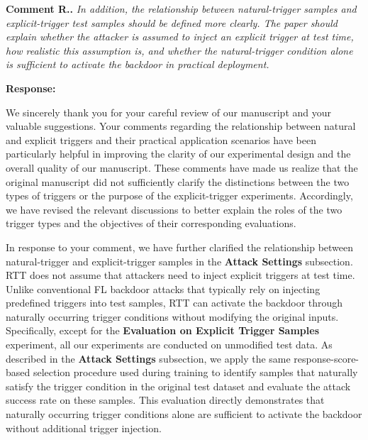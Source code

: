 \documentclass[11pt,a4paper]{article}
\newcommand{\manualindent}{\par\noindent\hspace*{1.5em}\ignorespaces}
\newcounter{reviewernum}
\newcounter{commentnum}
\newcommand{\reviewcomment}[1]{%
  \stepcounter{commentnum}%
  \begin{tcolorbox}[
      enhanced,breakable,colback=black!3,colframe=black!20,
      boxrule=0.5pt,arc=1.2mm,left=9pt,right=9pt,top=8pt,bottom=8pt]
    {\bfseries Comment R\arabic{reviewernum}.\arabic{commentnum}.}\quad
    {\itshape #1}
  \end{tcolorbox}%
}
\newcommand{\authorresponse}[1]{%
  {\bfseries\color{replyblue}Response:}\par
  #1\par\vspace{0.35em}%
}
\begin{document}
\reviewcomment{In addition, the relationship between natural-trigger samples and explicit-trigger test samples should be defined more clearly. The paper should explain whether the attacker is assumed to inject an explicit trigger at test time, how realistic this assumption is, and whether the natural-trigger condition alone is sufficient to activate the backdoor in practical deployment.}

\authorresponse{\manualindent We sincerely thank you for your careful review of our manuscript and your valuable suggestions.
Your comments regarding the relationship between natural and explicit triggers and their practical application scenarios have been particularly helpful in improving the clarity of our experimental design and the overall quality of our manuscript.
These comments have made us realize that the original manuscript did not sufficiently clarify the distinctions between the two types of triggers or the purpose of the explicit-trigger experiments.
Accordingly, we have revised the relevant discussions to better explain the roles of the two trigger types and the objectives of their corresponding evaluations.

\manualindent In response to your comment, we have further clarified the relationship between natural-trigger and explicit-trigger samples in the \textbf{Attack Settings} subsection.
RTT does not assume that attackers need to inject explicit triggers at test time.
Unlike conventional FL backdoor attacks that typically rely on injecting predefined triggers into test samples, RTT can activate the backdoor through naturally occurring trigger conditions without modifying the original inputs.
Specifically, except for the \textbf{Evaluation on Explicit Trigger Samples} experiment, all our experiments are conducted on unmodified test data.
As described in the \textbf{Attack Settings} subsection, we apply the same response-score-based selection procedure used during training to identify samples that naturally satisfy the trigger condition in the original test dataset and evaluate the attack success rate on these samples.
This evaluation directly demonstrates that naturally occurring trigger conditions alone are sufficient to activate the backdoor without additional trigger injection.

}
\end{document}
